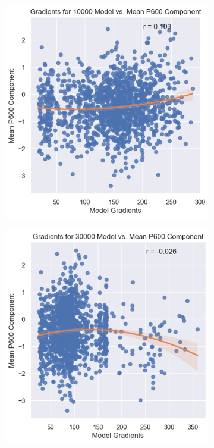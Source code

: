 \documentclass{IEEEtran}
\begin{document}
\begin{figure}[h]
    \centering
    \begin{subfigure}{0.4\textwidth}
        \centering
        \includegraphics[width=\textwidth]{gradients_vs_p600/10000.png}
    \end{subfigure}
    \begin{subfigure}{0.4\textwidth}
        \centering
        \includegraphics[width=\textwidth]{gradients_vs_p600/30000.png}
    \end{subfigure}
\end{figure}
\end{document}
